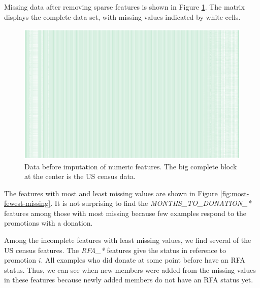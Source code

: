 \documentclass[
  11pt,
  a4paper,
  DIV=12,captions=tableheading,oneside,titlepage]{scrbook}
\begin{document}
Missing data after removing sparse features is shown in Figure \ref{fig:before-impute}. The matrix displays the complete data set, with missing values indicated by white cells.



\begin{figure}

{\centering \includegraphics[width=0.7\linewidth]{figures/imputation/missing-matrix} 

}

\caption{Data before imputation of numeric features. The big complete block at the center is the US census data. }\label{fig:before-impute}
\end{figure}

The features with most and least missing values are shown in Figure \ref{fig:most-fewest-missing}. It is not surprising to find the \emph{MONTHS\_TO\_DONATION\_*} features among those with most missing because few examples respond to the promotions with a donation.

Among the incomplete features with least missing values, we find several of the US census features. The \emph{RFA\_*} features give the status in reference to promotion \(i\). All examples who did donate at some point before have an RFA status. Thus, we can see when new members were added from the missing values in these features because newly added members do not have an RFA status yet.
\end{document}
